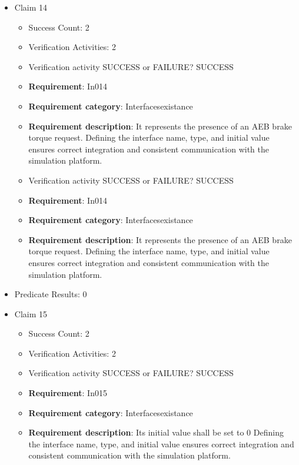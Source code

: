 \documentclass{article}
\begin{document}
\begin{itemize}
  				  \item Claim 14
				\begin{itemize}
			    	\item Success Count: 2 
			    	\item Verification Activities: 2
					\item Verification activity SUCCESS or FAILURE? SUCCESS
		
						\item \textbf{Requirement}: In014 
						\item \textbf{Requirement category}: Interfacesexistance 
						\item \textbf{Requirement description}: It represents the presence of an AEB brake torque request. Defining the interface name, type, and initial value ensures correct integration and consistent communication with the simulation platform.
					
					\item Verification activity SUCCESS or FAILURE? SUCCESS
		
						\item \textbf{Requirement}: In014 
						\item \textbf{Requirement category}: Interfacesexistance 
						\item \textbf{Requirement description}: It represents the presence of an AEB brake torque request. Defining the interface name, type, and initial value ensures correct integration and consistent communication with the simulation platform.
					
				\end{itemize}
				
									    
				\item Predicate Results: 0

  				  \item Claim 15
				\begin{itemize}
			    	\item Success Count: 2 
			    	\item Verification Activities: 2
					\item Verification activity SUCCESS or FAILURE? SUCCESS
		
						\item \textbf{Requirement}: In015 
						\item \textbf{Requirement category}: Interfacesexistance 
						\item \textbf{Requirement description}: Its initial value shall be set to 0 Defining the interface name, type, and initial value ensures correct integration and consistent communication with the simulation platform.
					

\end{itemize}
\end{itemize}
\end{document}
